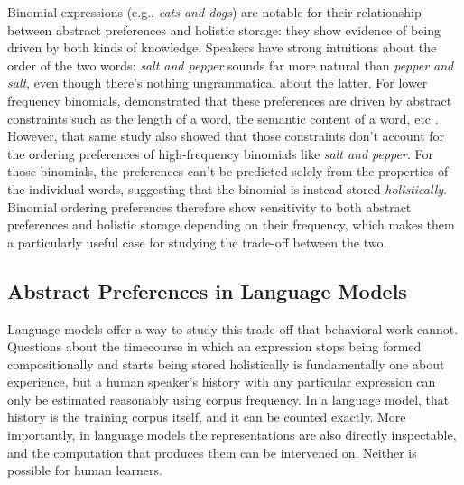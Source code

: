 \documentclass[11pt]{article}
\begin{document}
Binomial expressions (e.g., \emph{cats and dogs}) are notable for their
relationship between abstract preferences and holistic storage: they
show evidence of being driven by both kinds of knowledge. Speakers have
strong intuitions about the order of the two words: \emph{salt and
pepper} sounds far more natural than \emph{pepper and salt}, even though
there's nothing ungrammatical about the latter. For lower frequency
binomials, \citet{morgan2016} demonstrated that these preferences are
driven by abstract constraints such as the length of a word, the
semantic content of a word, etc \citep{benor2006}. However, that same
study also showed that those constraints don't account for the ordering
preferences of high-frequency binomials like \emph{salt and pepper}. For
those binomials, the preferences can't be predicted solely from the
properties of the individual words, suggesting that the binomial is
instead stored \emph{holistically}. Binomial ordering preferences
therefore show sensitivity to both abstract preferences and holistic
storage depending on their frequency, which makes them a particularly
useful case for studying the trade-off between the two.

\subsection{Abstract Preferences in Language
Models}\label{abstract-preferences-in-language-models}

Language models offer a way to study this trade-off that behavioral work
cannot. Questions about the timecourse in which an expression stops
being formed compositionally and starts being stored holistically is
fundamentally one about experience, but a human speaker's history with
any particular expression can only be estimated reasonably using corpus
frequency. In a language model, that history is the training corpus
itself, and it can be counted exactly. More importantly, in language
models the representations are also directly inspectable, and the
computation that produces them can be intervened on. Neither is possible
for human learners.
\end{document}
